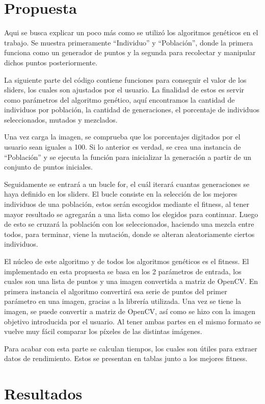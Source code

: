 \documentclass[conference]{IEEEtran}
\begin{document}
\section{Propuesta}
Aqui se busca explicar un poco más como se utilizó los algoritmos genéticos en el trabajo. Se muestra primeramente “Individuo” y “Población”, donde la primera funciona como un generador de puntos y la segunda para recolectar y manipular dichos puntos posteriormente. 

La siguiente parte del código contiene funciones para conseguir el valor de los sliders, los cuales son ajustados por el usuario. La finalidad de estos es servir como parámetros del algoritmo genético, aquí encontramos la cantidad de individuos por población, la cantidad de generaciones, el porcentaje de individuos seleccionados, mutados y mezclados.

Una vez carga la imagen, se comprueba que los porcentajes digitados por el usuario sean iguales a 100. Si lo anterior es verdad, se crea una instancia de “Población” y se ejecuta la función para inicializar la generación a partir de un conjunto de puntos iniciales. 

Seguidamente se entrará a un bucle for, el cuál iterará cuantas generaciones se haya definido en los sliders. El bucle consiste en la selección de los mejores individuos de una población, estos serán escogidos mediante el fitness, al tener mayor resultado se agregarán a una lista como los elegidos para continuar. Luego de esto se cruzará la población con los seleccionados, haciendo una mezcla entre todos, para terminar, viene la mutación, donde se alteran aleatoriamente ciertos individuos. 

El núcleo de este algoritmo y de todos los algoritmos genéticos es el fitness. El implementado en esta propuesta se basa en los 2 parámetros de entrada, los cuales son una lista de puntos y una imagen convertida a matriz de OpenCV. En primera instancia el algoritmo convertirá esa serie de puntos del primer parámetro en una imagen, gracias a la librería utilizada. Una vez se tiene la imagen, se puede convertir a matriz de OpenCV, así como se hizo con la imagen objetivo introducida por el usuario. Al tener ambas partes en el mismo formato se vuelve muy fácil comparar los píxeles de las distintas imágenes.

Para acabar con esta parte se calculan tiempos, los cuales son útiles para extraer datos de rendimiento. Estos se presentan en tablas junto a los mejores fitness. 


\section{Resultados}
\end{document}
